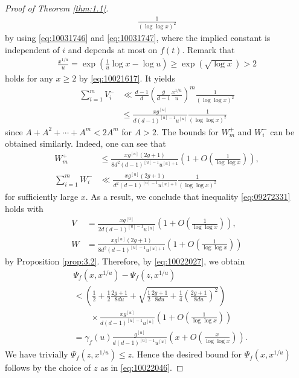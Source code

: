 \documentclass[a4paper,11pt]{amsart}
\theoremstyle{definition}
\numberwithin{equation}{section}
\begin{document}
\begin{proof}[Proof of Theorem \ref{thm:1.1}]
\begin{align*}
\frac{1}{(\log\log{x})^2}
\end{align*}
by using \eqref{eq:10031746} and \eqref{eq:10031747}, where the implied constant is independent of $i$ and depends at most on $f(t)$.  
Remark that 
\begin{align*}
\frac{x^{1/u}}{u}
= \exp\left(\frac{1}{u}\log{x}-\log{u}\right)
\geq \exp\left(\sqrt{\log{x}}\right)
> 2
\end{align*}
holds for any $x \geq2$ by \eqref{eq:10021617}. 
It yields
\begin{align*}
\sum_{i=1}^{m} V_i^-
&\ll \frac{d-1}{d} \left(\frac{g}{d-1}\frac{x^{1/u}}{u}\right)^m
\frac{1}{(\log\log{x})^2} \\
&\leq \frac{x g^{[u]}}{d(d-1)^{[u]-1} u^{[u]}} \frac{1}{(\log\log{x})^2} \nonumber 
\end{align*} 
since $A+A^2+\cdots+A^m<2A^m$ for $A>2$. 
The bounds for $W_m^+$ and $W_i^-$ can be obtained similarly. 
Indeed, one can see that
\begin{align*}
W_m^+
&\leq \frac{x g^{[u]}(2g+1)}{8d^2(d-1)^{[u]-1} u^{[u]+1}} 
\left(1+O\left(\frac{1}{\log\log{x}}\right)\right), \\
\sum_{i=1}^{m} W_i^-
&\ll \frac{x g^{[u]}(2g+1)}{d^2(d-1)^{[u]-1} u^{[u]+1}} 
\frac{1}{(\log\log{x})^2}
\end{align*}
for sufficiently large $x$. 
As a result, we conclude that inequality \eqref{eq:09272331} holds with 
\begin{align*}
V
&= \frac{x g^{[u]}}{2d(d-1)^{[u]-1} u^{[u]}}
\left(1+O\left(\frac{1}{\log\log{x}}\right)\right), \\
W
&= \frac{x g^{[u]}(2g+1)}{8d^2(d-1)^{[u]-1} u^{[u]+1}} 
\left(1+O\left(\frac{1}{\log\log{x}}\right)\right)
\end{align*}
by Proposition \ref{prop:3.2}. 
Therefore, by \eqref{eq:10022027}, we obtain
\begin{align*}
&\Psi_f(x,x^{1/u})-\Psi_f(z,x^{1/u}) \\
&< \left(\frac{1}{2}+\frac{1}{2}\frac{2g+1}{8du}+\sqrt{\frac{1}{2}\frac{2g+1}{8du}+\frac{1}{4}\left(\frac{2g+1}{8du}\right)^2}\right) \\
&\qquad \times
\frac{x g^{[u]}}{d(d-1)^{[u]-1} u^{[u]}} 
\left(1+O\left(\frac{1}{\log\log{x}}\right)\right) \\
&= \gamma_f(u) \frac{g^{[u]}}{d(d-1)^{[u]-1} u^{[u]}} 
\left(x+O\left(\frac{x}{\log\log{x}}\right)\right). 
\end{align*}
We have trivially $\Psi_f(z,x^{1/u})\leq z$. 
Hence the desired bound for $\Psi_f(x,x^{1/u})$ follows by the choice of $z$ as in \eqref{eq:10022046}. 
\end{proof}
\end{document}
